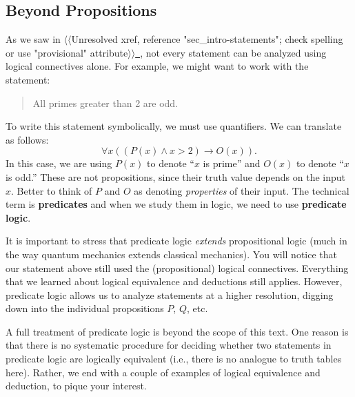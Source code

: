 \documentclass[10pt,]{book}
\newcommand{\terminology}[1]{\textbf{#1}}
\theoremstyle{plain}
\theoremstyle{definition}
\theoremstyle{definition}
\theoremstyle{definition}
\numberwithin{equation}{chapter}
\def\imp{\rightarrow}
\newcommand{\gt}{>}
\begin{document}
\subsection[{Beyond Propositions}]{Beyond Propositions}\label{subsection-44}
\hypertarget{p-2074}{}%
As we saw in {$\langle\langle$Unresolved xref, reference "sec\_intro-statements"; check spelling or use "provisional" attribute$\rangle\rangle$}\hyperlink{}{~}, not every statement can be analyzed using logical connectives alone.  For example, we might want to work with the statement:%
\begin{quote}\hypertarget{blockquote-12}{}
\hypertarget{p-2075}{}%
All primes greater than 2 are odd.%
\end{quote}
\hypertarget{p-2076}{}%
To write this statement symbolically, we must use quantifiers.  We can translate as follows:%
\begin{equation*}
\forall x ((P(x) \wedge x \gt 2) \imp O(x)).
\end{equation*}
In this case, we are using \(P(x)\) to denote ``\(x\) is prime'' and \(O(x)\) to denote ``\(x\) is odd.''  These are not propositions, since their truth value depends on the input \(x\).  Better to think of \(P\) and \(O\) as denoting \emph{properties} of their input.  The technical term is \terminology{predicates} and when we study them in logic, we need to use \terminology{predicate logic}.%
\par
\hypertarget{p-2077}{}%
It is important to stress that predicate logic \emph{extends} propositional logic (much in the way quantum mechanics extends classical mechanics).  You will notice that our statement above still used the (propositional) logical connectives.  Everything that we learned about logical equivalence and deductions still applies.  However, predicate logic allows us to analyze statements at a higher resolution, digging down into the individual propositions \(P\), \(Q\), etc.%
\par
\hypertarget{p-2078}{}%
A full treatment of predicate logic is beyond the scope of this text.  One reason is that there is no systematic procedure for deciding whether two statements in predicate logic are logically equivalent (i.e., there is no analogue to truth tables here).  Rather, we end with a couple of examples of logical equivalence and deduction, to pique your interest.%
\end{document}
